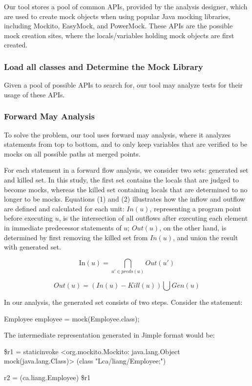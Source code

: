 Our tool stores a pool of common APIs, provided by the analysis designer, which are used to create mock objects when using popular Java mocking libraries, including Mockito, EasyMock, and PowerMock. These APIs are the possible mock creation sites, where the locals/variables holding mock objects are first created.

\subsubsection{Load all classes and Determine the Mock Library}
\label{subsubsec:library}

Given a pool of possible APIs to search for, our tool may analyze tests for their usage of these APIs.%


\subsubsection{Forward May Analysis}
\label{subsubsec:forward}

To solve the problem, our tool uses forward may analysis, where it analyzes statements from top to bottom, and to only keep variables that are verified to be mocks on all possible paths at merged points. 

For each statement in a forward flow analysis, we consider two sets: generated set and killed set. In this study, the first set contains the locals that are judged to become mocks, whereas the killed set containing locals that are determined to no longer to be mocks. Equations (1) and (2) illustrates how the inflow and outflow are defined and calculated for each unit: $In(u)$, representing a program point before executing $u$, is the intersection of all outflows after executing each element in immediate predecessor statements of $u$; $Out(u)$, on the other hand, is determined by first removing the killed set from $In(u)$, and union the result with generated set. 

\begin{equation}
\mathrm{In}(u) = \bigcap_{u' \in preds(u)} Out(u') 
\end{equation}

\begin{equation}
Out(u) = (In(u) - Kill(u)) \bigcup Gen(u) 
\end{equation}

In our analysis, the generated set consists of two steps. Consider the statement: 
\begin{verbatim*}
Employee employee = mock(Employee.class);
\end{verbatim*}
The intermediate representation generated in Jimple format would be:
\begin{verbatim*}
\$r1 = staticinvoke <org.mockito.Mockito: 
java.lang.Object mock(java.lang.Class)>
(class "Lca/liang/Employee;")

r2 = (ca.liang.Employee) \$r1
\end{verbatim*}

